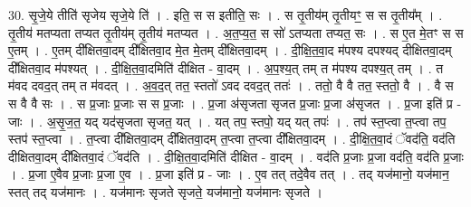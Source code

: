 \documentclass[17pt]{extarticle}
\begin{document}
30. सृ॒जे॒ये तीति॑ सृजेय सृजे॒ये ति॑ । . इति॒ स स इतीति॒ सः । . स तृ॒तीय॑म् तृ॒तीयꣳ॒॒ स स तृ॒तीय᳚म् । . तृ॒तीय॑ मतप्यता तप्यत तृ॒तीय॑म् तृ॒तीय॑ मतप्यत । . अ॒त॒प्य॒त॒ स सो॑ ऽतप्यता तप्यत॒ सः । . स ए॒त मे॒तꣳ स स ए॒तम् । . ए॒तम् दी᳚क्षितवा॒दम् दी᳚क्षितवा॒द मे॒त मे॒तम् दी᳚क्षितवा॒दम् । . दी॒क्षि॒त॒वा॒द म॑पश्य दपश्यद् दीक्षितवा॒दम् दी᳚क्षितवा॒द म॑पश्यत् । . दी॒क्षि॒त॒वा॒दमिति॑ दीक्षित - वा॒दम् । . अ॒प॒श्य॒त् तम् त म॑पश्य दपश्य॒त् तम् । . त म॑वद दवद॒त् तम् त म॑वदत् । . अ॒व॒द॒त् तत॒ स्ततो॑ ऽवद दवद॒त् ततः॑ । . ततो॒ वै वै तत॒ स्ततो॒ वै । . वै स स वै वै सः । . स प्र॒जाः प्र॒जाः स स प्र॒जाः । . प्र॒जा अ॑सृजता सृजत प्र॒जाः प्र॒जा अ॑सृजत । . प्र॒जा इति॑ प्र - जाः । . अ॒सृ॒ज॒त॒ यद् यद॑सृजता सृजत॒ यत् । . यत् तप॒ स्तपो॒ यद् यत् तपः॑ । . तप॑ स्त॒प्त्वा त॒प्त्वा तप॒ स्तप॑ स्त॒प्त्वा । . त॒प्त्वा दी᳚क्षितवा॒दम् दी᳚क्षितवा॒दम् त॒प्त्वा त॒प्त्वा दी᳚क्षितवा॒दम् । . दी॒क्षि॒त॒वा॒दं ॅवद॑ति॒ वद॑ति दीक्षितवा॒दम् दी᳚क्षितवा॒दं ॅवद॑ति । . दी॒क्षि॒त॒वा॒दमिति॑ दीक्षित - वा॒दम् । . वद॑ति प्र॒जाः प्र॒जा वद॑ति॒ वद॑ति प्र॒जाः । . प्र॒जा ए॒वैव प्र॒जाः प्र॒जा ए॒व । . प्र॒जा इति॑ प्र - जाः । . ए॒व तत् तदे॒वैव तत् । . तद् यज॑मानो॒ यज॑मान॒ स्तत् तद् यज॑मानः । . यज॑मानः सृजते सृजते॒ यज॑मानो॒ यज॑मानः सृजते । \newline
\end{document}
